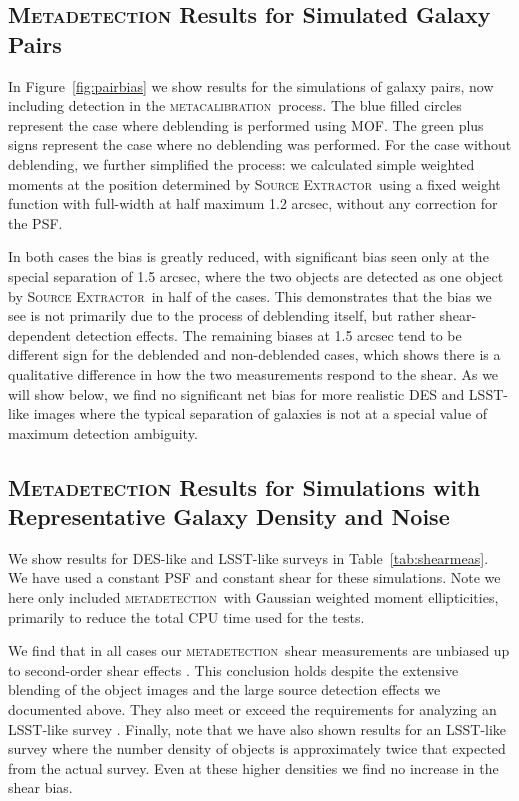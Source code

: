 \documentclass[draft, iop, twocolappendix, appendixfloats, numberedappendix, apj]{hackemulateapj}
\newcommand{\mcal}{\textsc{metacalibration}}
\newcommand{\mdet}{\textsc{metadetection}}
\newcommand{\sx}{\textsc{Source Extractor}}
\begin{document}
\subsection{\textsc{Metadetection} Results for Simulated Galaxy Pairs}
\label{sec:mdetpairs}

In Figure~\ref{fig:pairbias} we show results for the simulations of galaxy
pairs, now including detection in the \mcal\ process. The blue filled circles
represent the case where deblending is performed using MOF. The green plus
signs represent the case where no deblending was performed. For the case
without deblending,  we further simplified the process: we calculated
simple weighted moments at the position determined by \sx\ using a fixed weight function
with full-width at half maximum 1.2 arcsec, without any correction for the PSF.

In both cases the bias is greatly reduced, with significant bias seen only at
the special separation of 1.5 arcsec, where the two objects are detected as one
object by \sx\ in half of the cases. This demonstrates that the bias we see is
not primarily due to the process of deblending itself, but rather
shear-dependent detection effects. The remaining biases at 1.5 arcsec tend to
be different sign for the deblended and non-deblended cases, which shows there
is a qualitative difference in how the two measurements respond to the shear.
As we will show below, we find no significant net bias for more realistic DES
and LSST-like images where the typical separation of galaxies is not at a
special value of maximum detection ambiguity.

\subsection{\textsc{Metadetection} Results for Simulations with Representative Galaxy Density and Noise}
\label{sec:res:constpsf}

We show results for DES-like and LSST-like surveys in Table~\ref{tab:shearmeas}.
We have used a constant PSF and constant shear for these simulations.
Note we here only included \mdet\ with Gaussian weighted moment ellipticities,
primarily to reduce the total CPU time used for the tests.

We find that in all cases our \mdet\ shear measurements are unbiased up to
second-order shear effects \citep[we expect a bias of a few parts in 10000 for
shears of 0.02, see][]{SheldonMcal2017}. This conclusion holds despite the
extensive blending of the object images and the large source detection effects
we documented above. They also meet or exceed the requirements for analyzing an
LSST-like survey \citep[e.g.,][]{huterer2006}. Finally, note that we have also
shown results for an LSST-like survey where the number density of objects is
approximately twice that expected from the actual survey.  Even at these higher
densities we find no increase in the shear bias.
\end{document}

